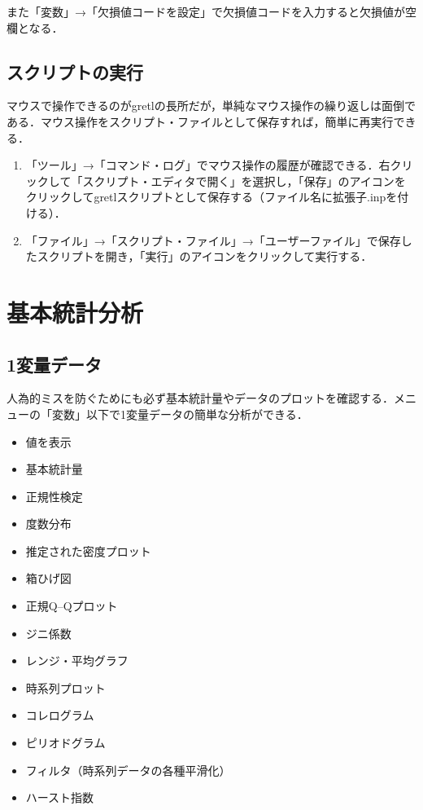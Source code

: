 \documentclass[
]{jlreq}
\providecommand{\tightlist}{%
  \setlength{\itemsep}{0pt}\setlength{\parskip}{0pt}}
\begin{document}
また「変数」→「欠損値コードを設定」で欠損値コードを入力すると欠損値が空欄となる．

\subsection{スクリプトの実行}\label{ux30b9ux30afux30eaux30d7ux30c8ux306eux5b9fux884c}

マウスで操作できるのがgretlの長所だが，単純なマウス操作の繰り返しは面倒である．マウス操作をスクリプト・ファイルとして保存すれば，簡単に再実行できる．

\begin{enumerate}
\def\labelenumi{\arabic{enumi}.}
\tightlist
\item
  「ツール」→「コマンド・ログ」でマウス操作の履歴が確認できる．右クリックして「スクリプト・エディタで開く」を選択し，「保存」のアイコンをクリックしてgretlスクリプトとして保存する（ファイル名に拡張子.inpを付ける）．
\item
  「ファイル」→「スクリプト・ファイル」→「ユーザーファイル」で保存したスクリプトを開き，「実行」のアイコンをクリックして実行する．
\end{enumerate}

\section{基本統計分析}\label{ux57faux672cux7d71ux8a08ux5206ux6790}

\subsection{1変量データ}\label{ux5909ux91cfux30c7ux30fcux30bf}

人為的ミスを防ぐためにも必ず基本統計量やデータのプロットを確認する．メニューの「変数」以下で1変量データの簡単な分析ができる．

\begin{itemize}
\tightlist
\item
  値を表示
\item
  基本統計量
\item
  正規性検定
\item
  度数分布
\item
  推定された密度プロット
\item
  箱ひげ図
\item
  正規Q--Qプロット
\item
  ジニ係数
\item
  レンジ・平均グラフ
\item
  時系列プロット
\item
  コレログラム
\item
  ピリオドグラム
\item
  フィルタ（時系列データの各種平滑化）
\item
  ハースト指数
\end{itemize}
\end{document}
